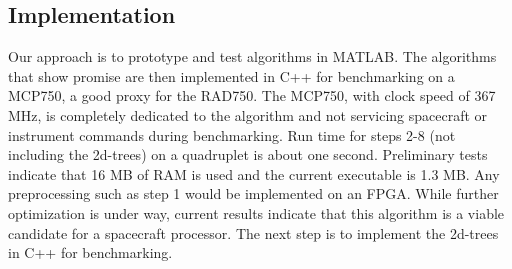 \subsection{Implementation}
Our approach is to prototype and test algorithms in MATLAB. The algorithms that show promise are then implemented in C++ 
for benchmarking on a MCP750, a good proxy for the RAD750. The MCP750,  with clock speed of 367 MHz, is completely dedicated to the algorithm and not servicing spacecraft or instrument commands during benchmarking.  Run time for steps 2-8 (not including the 2d-trees) on a quadruplet is about one second. Preliminary tests indicate that 16 MB of RAM is used and the current executable is 1.3 MB. Any preprocessing such as step 1 would be implemented on an FPGA. While further optimization is under way, current results indicate that this algorithm is a viable candidate for a spacecraft processor. The next step is to implement the 2d-trees in C++ for benchmarking.  

